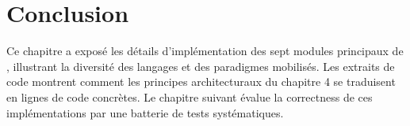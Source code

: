 \section*{Conclusion}

Ce chapitre a exposé les détails d'implémentation des sept modules principaux de
\caimp{}, illustrant la diversité des langages et des paradigmes mobilisés.
Les extraits de code montrent comment les principes architecturaux du chapitre 4
se traduisent en lignes de code concrètes. Le chapitre suivant évalue la
correctness de ces implémentations par une batterie de tests systématiques.
